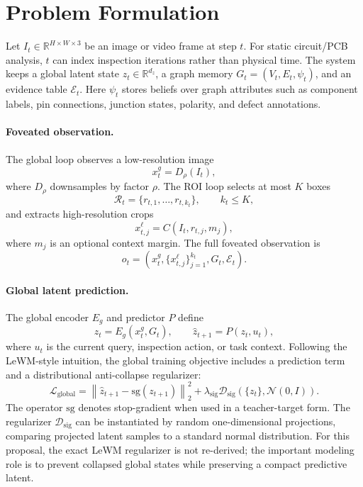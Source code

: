 \documentclass[11pt]{article}
\begin{document}
\section{Problem Formulation}

Let $I_t \in \mathbb{R}^{H \times W \times 3}$ be an image or video frame at step $t$.
For static circuit/PCB analysis, $t$ can index inspection iterations rather than physical time.
The system keeps a global latent state $z_t \in \mathbb{R}^{d_z}$, a graph memory $G_t=(V_t,E_t,\psi_t)$, and an evidence table $\mathcal{E}_t$.
Here $\psi_t$ stores beliefs over graph attributes such as component labels, pin connections, junction states, polarity, and defect annotations.

\paragraph{Foveated observation.}
The global loop observes a low-resolution image
\begin{equation}
  x_t^g = D_\rho(I_t),
\end{equation}
where $D_\rho$ downsamples by factor $\rho$.
The ROI loop selects at most $K$ boxes
\begin{equation}
  \mathcal{R}_t = \{r_{t,1},\ldots,r_{t,k_t}\}, \qquad k_t \le K,
\end{equation}
and extracts high-resolution crops
\begin{equation}
  x_{t,j}^{\ell} = C(I_t,r_{t,j},m_j),
\end{equation}
where $m_j$ is an optional context margin.
The full foveated observation is
\begin{equation}
  o_t = \left(x_t^g,\{x_{t,j}^{\ell}\}_{j=1}^{k_t},G_t,\mathcal{E}_t\right).
\end{equation}

\paragraph{Global latent prediction.}
The global encoder $E_g$ and predictor $P$ define
\begin{equation}
  z_t = E_g(x_t^g,G_t), \qquad
  \hat z_{t+1}=P(z_t,u_t),
\end{equation}
where $u_t$ is the current query, inspection action, or task context.
Following the LeWM-style intuition, the global training objective includes a prediction term and a distributional anti-collapse regularizer:
\begin{equation}
  \mathcal{L}_{\mathrm{global}}
  =
  \left\|\hat z_{t+1} - \mathrm{sg}(z_{t+1})\right\|_2^2
  +
  \lambda_{\mathrm{sig}}\mathcal{D}_{\mathrm{sig}}(\{z_t\},\mathcal{N}(0,I)).
  \label{eq:global-loss}
\end{equation}
The operator $\mathrm{sg}$ denotes stop-gradient when used in a teacher-target form.
The regularizer $\mathcal{D}_{\mathrm{sig}}$ can be instantiated by random one-dimensional projections, comparing projected latent samples to a standard normal distribution.
For this proposal, the exact LeWM regularizer is not re-derived; the important modeling role is to prevent collapsed global states while preserving a compact predictive latent.
\end{document}
